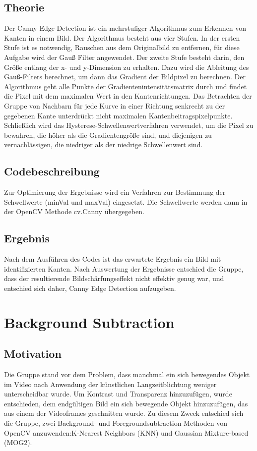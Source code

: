 \documentclass[12pt]{scrartcl}
\begin{document}
\subsection{Theorie}
Der Canny Edge Detection ist ein mehrstufiger Algorithmus zum Erkennen von Kanten in einem Bild. Der Algorithmus besteht aus vier Stufen. In der ersten Stufe ist es notwendig, Rauschen aus dem Originalbild zu entfernen, f\"ur diese Aufgabe wird der Gau{\ss} Filter angewendet. Der zweite Stufe besteht darin, den Gr\"o{\ss}e entlang der x- und y-Dimension zu erhalten. Dazu wird die Ableitung des Gau{\ss}-Filters berechnet, um dann das Gradient der Bildpixel zu berechnen.
Der Algorithmus geht alle Punkte der Gradientenintensit\"atsmatrix durch und findet die Pixel mit dem maximalen Wert in den Kantenrichtungen.
Das Betrachten der Gruppe von Nachbarn f\"ur jede Kurve in einer Richtung senkrecht zu der gegebenen Kante unterdr\"uckt nicht maximalen Kantenbeitragspixelpunkte. Schlie{\ss}lich wird das Hysterese-Schwellenwertverfahren verwendet, um die Pixel zu bewahren, die h\"oher als die Gradientengr\"o{\ss}e sind, und diejenigen zu vernachl\"assigen, die niedriger als der niedrige Schwellenwert sind.
\subsection{Codebeschreibung}
Zur Optimierung der Ergebnisse wird ein Verfahren zur Bestimmung der Schwellwerte (minVal und maxVal) eingesetzt. Die Schwellwerte werden dann in der OpenCV Methode cv.Canny \"ubergegeben.\\
\subsection{Ergebnis}
Nach dem Ausf\"uhren des Codes ist das erwartete Ergebnis ein Bild mit identifizierten Kanten. Nach Auswertung der Ergebnisse entschied die Gruppe, dass der resultierende Bildsch\"arfungseffekt nicht effektiv genug war, und entschied sich daher, Canny Edge Detection aufzugeben.\\
\section{Background Subtraction}
\subsection{Motivation}
Die Gruppe stand vor dem Problem, dass manchmal ein sich bewegendes Objekt im Video nach Anwendung der k\"unstlichen Langzeitblichtung weniger unterscheidbar wurde. Um Kontrast und Transparenz hinzuzuf\"ugen, wurde entschieden, dem endg\"ultigen Bild ein sich bewegende Objekt hinzuzuf\"ugen, das aus einem der Videoframes geschnitten wurde.
Zu diesem Zweck entschied sich die Gruppe, zwei Background- und Foregroundsubtraction Methoden von OpenCV anzuwenden:K-Nearest Neighbors (KNN) und Gaussian Mixture-based (MOG2).\\
\end{document}
